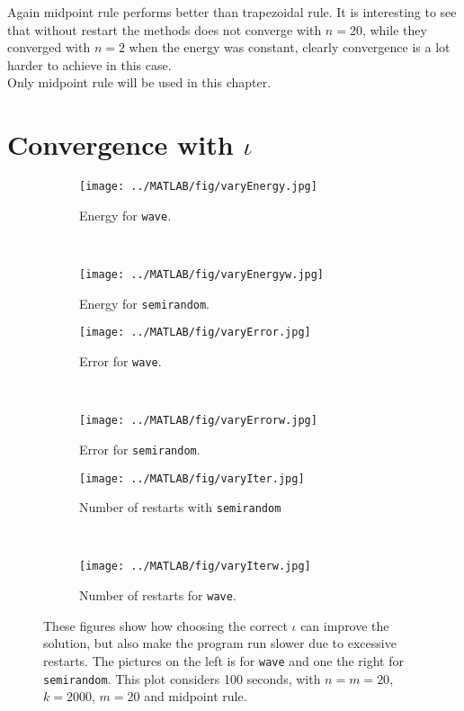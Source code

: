 Again midpoint rule performs better than trapezoidal rule. It is interesting to see that without restart the methods does not converge with $n = 20$, while they converged with $n = 2$ when the energy was constant, clearly convergence is a lot harder to achieve in this case. \\
Only midpoint rule will be used in this chapter.\\

\section{Convergence with $\iota$} %

\begin{figure}[H]
        \centering
        \begin{subfigure}[b]{0.45\textwidth}
                \texttt{[image: ../MATLAB/fig/varyEnergy.jpg]}
                \caption{ Energy for \texttt{wave}. }
                \label{fig:varyEnergy}
        \end{subfigure}%
        ~
        \begin{subfigure}[b]{0.45\textwidth}
                \texttt{[image: ../MATLAB/fig/varyEnergyw.jpg]}
                \caption{ Energy for \texttt{semirandom}. }
                \label{fig:varyEnergyw}
        \end{subfigure}
		
		\begin{subfigure}[b]{0.45\textwidth}
                \texttt{[image: ../MATLAB/fig/varyError.jpg]}
                \caption{ Error for \texttt{wave}. }
                \label{fig:varyError}
        \end{subfigure}%
        ~
        \begin{subfigure}[b]{0.45\textwidth}
                \texttt{[image: ../MATLAB/fig/varyErrorw.jpg]}
                \caption{ Error for \texttt{semirandom}. }
                \label{fig:varyErrorw}
        \end{subfigure}
        
        		\begin{subfigure}[b]{0.45\textwidth}
                \texttt{[image: ../MATLAB/fig/varyIter.jpg]}
                \caption{ Number of restarts with \texttt{semirandom} }
                \label{fig:varyIter}
        \end{subfigure}%
        ~
        \begin{subfigure}[b]{0.45\textwidth}
                \texttt{[image: ../MATLAB/fig/varyIterw.jpg]}
                \caption{ Number of restarts for \texttt{wave}. }
                \label{fig:varyIterw}
        \end{subfigure}
        \caption{ These figures show how choosing the correct $\iota$ can improve the solution, but also make the program run slower due to excessive restarts. The pictures on the left is for \texttt{wave} and one the right for \texttt{semirandom}. This plot considers 100 seconds, with  $n=m=20$, $k = 2000$, $m = 20$ and midpoint rule. }
        \label{fig:variota}
\end{figure}
